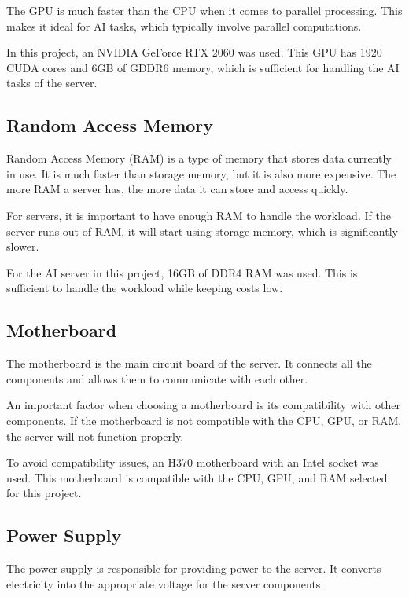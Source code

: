 The GPU is much faster than the CPU when it comes to parallel processing. This makes it ideal for AI tasks, which typically involve parallel computations.

In this project, an NVIDIA GeForce RTX 2060 was used. This GPU has 1920 CUDA cores and 6GB of GDDR6 memory, which is sufficient for handling the AI tasks of the server.

\cite{GPU}
\cite{GF2060}

\subsection{Random Access Memory}

Random Access Memory (RAM) is a type of memory that stores data currently in use. It is much faster than storage memory, but it is also more expensive. The more RAM a server has, the more data it can store and access quickly.

For servers, it is important to have enough RAM to handle the workload. If the server runs out of RAM, it will start using storage memory, which is significantly slower.

For the AI server in this project, 16GB of DDR4 RAM was used. This is sufficient to handle the workload while keeping costs low.

\cite{RAM}

\subsection{Motherboard}

The motherboard is the main circuit board of the server. It connects all the components and allows them to communicate with each other.

An important factor when choosing a motherboard is its compatibility with other components. If the motherboard is not compatible with the CPU, GPU, or RAM, the server will not function properly.

To avoid compatibility issues, an H370 motherboard with an Intel socket was used. This motherboard is compatible with the CPU, GPU, and RAM selected for this project.

\cite{Motherboard}

\subsection{Power Supply}

The power supply is responsible for providing power to the server. It converts electricity into the appropriate voltage for the server components.

